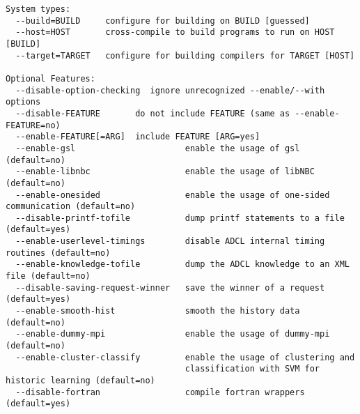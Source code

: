 \begin{verbatim}
System types:
  --build=BUILD     configure for building on BUILD [guessed]
  --host=HOST       cross-compile to build programs to run on HOST [BUILD]
  --target=TARGET   configure for building compilers for TARGET [HOST]

Optional Features:
  --disable-option-checking  ignore unrecognized --enable/--with options
  --disable-FEATURE       do not include FEATURE (same as --enable-FEATURE=no)
  --enable-FEATURE[=ARG]  include FEATURE [ARG=yes]
  --enable-gsl                      enable the usage of gsl (default=no)
  --enable-libnbc                   enable the usage of libNBC (default=no)
  --enable-onesided                 enable the usage of one-sided communication (default=no)
  --disable-printf-tofile           dump printf statements to a file (default=yes)
  --enable-userlevel-timings        disable ADCL internal timing routines (default=no)
  --enable-knowledge-tofile         dump the ADCL knowledge to an XML file (default=no)
  --disable-saving-request-winner   save the winner of a request (default=yes)
  --enable-smooth-hist              smooth the history data (default=no)
  --enable-dummy-mpi                enable the usage of dummy-mpi (default=no)
  --enable-cluster-classify         enable the usage of clustering and
                                    classification with SVM for historic learning (default=no)
  --disable-fortran                 compile fortran wrappers (default=yes)


\end{verbatim}
